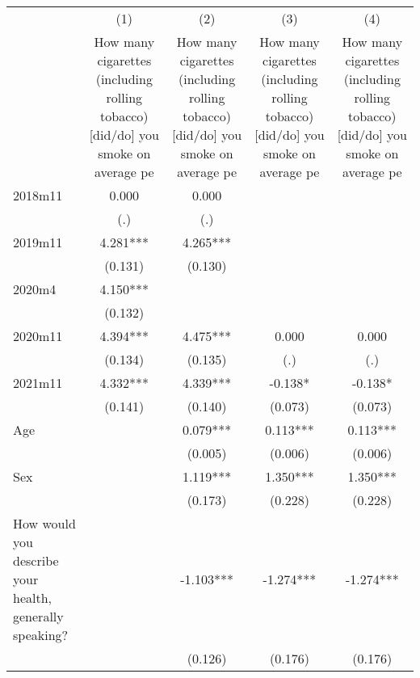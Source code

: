 {
\def\sym#1{\ifmmode^{#1}\else\(^{#1}\)\fi}
\begin{tabular}{l*{4}{c}}
\hline\hline
                &\multicolumn{1}{c}{(1)}&\multicolumn{1}{c}{(2)}&\multicolumn{1}{c}{(3)}&\multicolumn{1}{c}{(4)}\\
                &\multicolumn{1}{c}{How many cigarettes (including rolling tobacco) [did/do] you smoke on average pe}&\multicolumn{1}{c}{How many cigarettes (including rolling tobacco) [did/do] you smoke on average pe}&\multicolumn{1}{c}{How many cigarettes (including rolling tobacco) [did/do] you smoke on average pe}&\multicolumn{1}{c}{How many cigarettes (including rolling tobacco) [did/do] you smoke on average pe}\\
\hline
2018m11         &    0.000   &    0.000   &            &            \\
                &      (.)   &      (.)   &            &            \\
[1em]
2019m11         &    4.281***&    4.265***&            &            \\
                &  (0.131)   &  (0.130)   &            &            \\
[1em]
 2020m4         &    4.150***&            &            &            \\
                &  (0.132)   &            &            &            \\
[1em]
2020m11         &    4.394***&    4.475***&    0.000   &    0.000   \\
                &  (0.134)   &  (0.135)   &      (.)   &      (.)   \\
[1em]
2021m11         &    4.332***&    4.339***&   -0.138*  &   -0.138*  \\
                &  (0.141)   &  (0.140)   &  (0.073)   &  (0.073)   \\
[1em]
Age             &            &    0.079***&    0.113***&    0.113***\\
                &            &  (0.005)   &  (0.006)   &  (0.006)   \\
[1em]
Sex             &            &    1.119***&    1.350***&    1.350***\\
                &            &  (0.173)   &  (0.228)   &  (0.228)   \\
[1em]
How would you describe your health, generally speaking?&            &   -1.103***&   -1.274***&   -1.274***\\
                &            &  (0.126)   &  (0.176)   &  (0.176)   \\

\end{tabular}}
